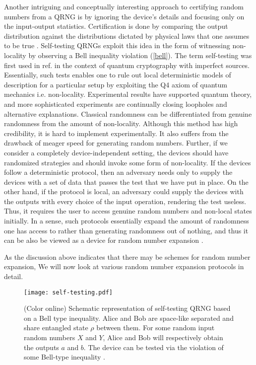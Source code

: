 \documentclass[]{interact}
\theoremstyle{plain}%
\theoremstyle{definition}
\theoremstyle{remark}
\begin{document}
Another intriguing and conceptually interesting approach to certifying random numbers from a QRNG  is by ignoring the device's details and focusing only on the input-output statistics. Certification is done by comparing the output distribution against the distributions dictated by physical laws that one assumes to be true \cite{colbeck2009quantum}. Self-testing QRNGs exploit this idea in the form of witnessing non-locality \cite{bell1964einstein} by observing a Bell
inequality violation (\autoref{bell}). The term self-testing was first used in ref. \cite{Mayers1998Sep} in the context of quantum cryptography with imperfect sources.    Essentially,  such tests enables one to rule out local deterministic models of description for a particular setup by exploiting the Q4 axiom of quantum mechanics i.e. non-locality. Experimental results have supported quantum theory, and more sophisticated experiments are continually closing loopholes and alternative explanations. Classical randomness can be differentiated from genuine randomness from the amount of non-locality. Although this method has high credibility, it is hard to implement experimentally. It also suffers from the drawback of meager speed for generating random numbers.  Further, if we consider a completely device-independent setting, the devices should have randomized strategies and should invoke some form of non-locality. If the devices follow a deterministic protocol, then an adversary needs only to supply the devices with a set of data that passes the test that we have put in place. On the other hand, if the protocol is local, an adversary could supply the devices with the outputs with every choice of the input operation, rendering the test useless. Thus, it requires the user to access genuine random numbers and non-local states initially. In a sense, such protocols essentially expand the amount of randomness one has access to rather than generating randomness out of nothing, and thus it can be also be viewed as a device for random number expansion \cite{colbeck2009quantum}. 

As the discussion above indicates that there may be schemes for random number expansion, We will now look at various random number expansion protocols in detail. 
\begin{figure}
    \centering
    \texttt{[image: self-testing.pdf]}
    \caption{(Color online) Schematic representation of self-testing QRNG based on a Bell type inequality. Alice and Bob are space-like separated and share entangled state $\rho$ between them. For some random input random numbers $X$ and $Y$, Alice and Bob will respectively obtain the outputs $a$ and $b$. The device can be tested via the violation of some Bell-type inequality \cite{ma2016quantum}. }
    \label{bell}
\end{figure}
\end{document}
